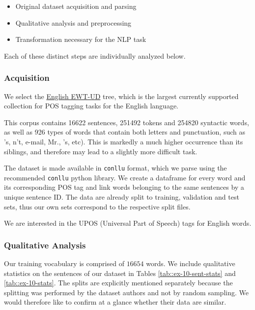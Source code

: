 \documentclass[10pt, a4paper]{article}
\begin{document}
	\begin{itemize}
		\item Original dataset acquisition and parsing
		\item Qualitative analysis and preprocessing
		\item Transformation necessary for the NLP task
	\end{itemize}
	
	Each of these distinct steps are individually analyzed below.
	
	
	\subsubsection{Acquisition}
	
	We select the \href{https://universaldependencies.org/treebanks/en_ewt/index.html}{English EWT-UD} tree, which is the largest currently supported collection for POS tagging tasks for the English language.
	
	This corpus contains 16622 sentences, 251492 tokens and 254820 syntactic words, as well as 926 types of words that contain both letters and punctuation, such as 's, n't, e-mail, Mr., ’s, etc). This is markedly a much higher occurrence than its siblings, and therefore may lead to a slightly more difficult task.
	
	The dataset is made available in \texttt{conllu} format, which we parse using the recommended \texttt{conllu} python library. We create a dataframe for every word and its corresponding POS tag and link words belonging to the same sentences by a unique sentence ID. The data are already split to training, validation and test sets, thus our own sets correspond to the respective split files.
	
	We are interested in the UPOS (Universal Part of Speech) tags for English words.
	
	\subsubsection{Qualitative Analysis}
	
	Our training vocabulary is comprised of $16654$ words. We include qualitative statistics on the sentences of our dataset in Tables \ref{tab::ex-10-sent-stats} and \ref{tab::ex-10-stats}. The splits are explicitly mentioned separately because the splitting was performed by the dataset authors and not by random sampling. We would therefore like to confirm at a glance whether their data are similar.
	
\end{document}
